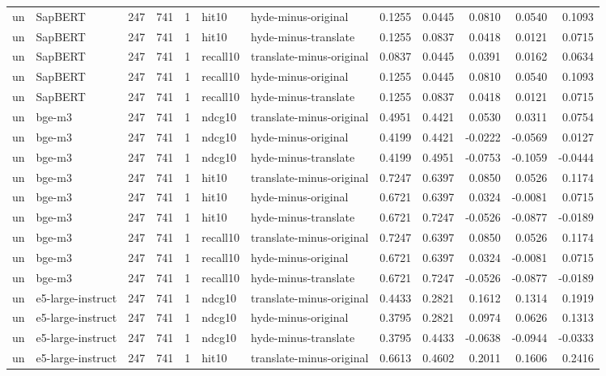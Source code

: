 \begin{tabular}{llrrrllrrrrr}
un & SapBERT & 247 & 741 & 1 & hit10 & hyde-minus-original & 0.1255 & 0.0445 & 0.0810 & 0.0540 & 0.1093 \\
un & SapBERT & 247 & 741 & 1 & hit10 & hyde-minus-translate & 0.1255 & 0.0837 & 0.0418 & 0.0121 & 0.0715 \\
un & SapBERT & 247 & 741 & 1 & recall10 & translate-minus-original & 0.0837 & 0.0445 & 0.0391 & 0.0162 & 0.0634 \\
un & SapBERT & 247 & 741 & 1 & recall10 & hyde-minus-original & 0.1255 & 0.0445 & 0.0810 & 0.0540 & 0.1093 \\
un & SapBERT & 247 & 741 & 1 & recall10 & hyde-minus-translate & 0.1255 & 0.0837 & 0.0418 & 0.0121 & 0.0715 \\
un & bge-m3 & 247 & 741 & 1 & ndcg10 & translate-minus-original & 0.4951 & 0.4421 & 0.0530 & 0.0311 & 0.0754 \\
un & bge-m3 & 247 & 741 & 1 & ndcg10 & hyde-minus-original & 0.4199 & 0.4421 & -0.0222 & -0.0569 & 0.0127 \\
un & bge-m3 & 247 & 741 & 1 & ndcg10 & hyde-minus-translate & 0.4199 & 0.4951 & -0.0753 & -0.1059 & -0.0444 \\
un & bge-m3 & 247 & 741 & 1 & hit10 & translate-minus-original & 0.7247 & 0.6397 & 0.0850 & 0.0526 & 0.1174 \\
un & bge-m3 & 247 & 741 & 1 & hit10 & hyde-minus-original & 0.6721 & 0.6397 & 0.0324 & -0.0081 & 0.0715 \\
un & bge-m3 & 247 & 741 & 1 & hit10 & hyde-minus-translate & 0.6721 & 0.7247 & -0.0526 & -0.0877 & -0.0189 \\
un & bge-m3 & 247 & 741 & 1 & recall10 & translate-minus-original & 0.7247 & 0.6397 & 0.0850 & 0.0526 & 0.1174 \\
un & bge-m3 & 247 & 741 & 1 & recall10 & hyde-minus-original & 0.6721 & 0.6397 & 0.0324 & -0.0081 & 0.0715 \\
un & bge-m3 & 247 & 741 & 1 & recall10 & hyde-minus-translate & 0.6721 & 0.7247 & -0.0526 & -0.0877 & -0.0189 \\
un & e5-large-instruct & 247 & 741 & 1 & ndcg10 & translate-minus-original & 0.4433 & 0.2821 & 0.1612 & 0.1314 & 0.1919 \\
un & e5-large-instruct & 247 & 741 & 1 & ndcg10 & hyde-minus-original & 0.3795 & 0.2821 & 0.0974 & 0.0626 & 0.1313 \\
un & e5-large-instruct & 247 & 741 & 1 & ndcg10 & hyde-minus-translate & 0.3795 & 0.4433 & -0.0638 & -0.0944 & -0.0333 \\
un & e5-large-instruct & 247 & 741 & 1 & hit10 & translate-minus-original & 0.6613 & 0.4602 & 0.2011 & 0.1606 & 0.2416 \\

\end{tabular}
